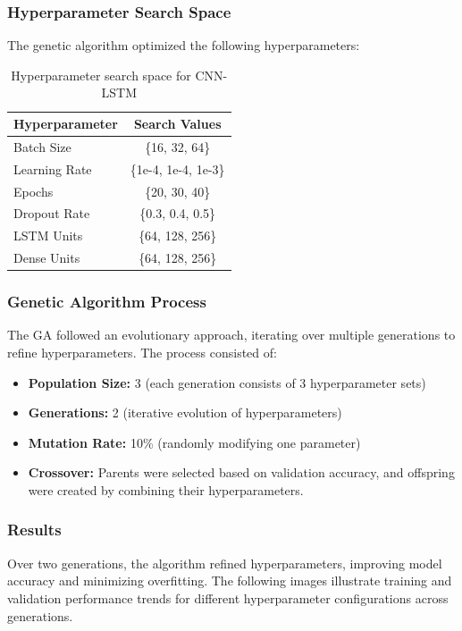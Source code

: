 \subsubsection{Hyperparameter Search Space}
The genetic algorithm optimized the following hyperparameters:

\begin{table}[h]
    \centering
    \begin{tabular}{|l|c|}
        \hline
        \textbf{Hyperparameter} & \textbf{Search Values} \\
        \hline
        Batch Size & \{16, 32, 64\} \\
        Learning Rate & \{1e-4, 1e-4, 1e-3\} \\
        Epochs & \{20, 30, 40\} \\
        Dropout Rate & \{0.3, 0.4, 0.5\} \\
        LSTM Units & \{64, 128, 256\} \\
        Dense Units & \{64, 128, 256\} \\
        \hline
    \end{tabular}
    \caption{Hyperparameter search space for CNN-LSTM}
    \label{tab:search_space}
\end{table}

\subsubsection{Genetic Algorithm Process}
The GA followed an evolutionary approach, iterating over multiple generations to refine hyperparameters. The process consisted of:

\begin{itemize}
    \item \textbf{Population Size:} 3 (each generation consists of 3 hyperparameter sets)
    \item \textbf{Generations:} 2 (iterative evolution of hyperparameters)
    \item \textbf{Mutation Rate:} 10\% (randomly modifying one parameter)
    \item \textbf{Crossover:} Parents were selected based on validation accuracy, and offspring were created by combining their hyperparameters.
\end{itemize}
\subsubsection{Results}
Over two generations, the algorithm refined hyperparameters, improving model accuracy and minimizing overfitting. The following images illustrate training and validation performance trends for different hyperparameter configurations across generations.

